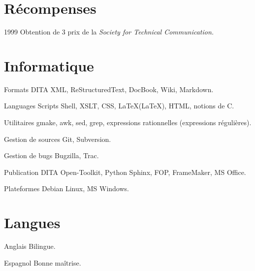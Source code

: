 \documentclass[12pt,a4paper,roman]{moderncv}
\begin{document}

\section{Récompenses}

\cvitem
    {1999}
    {Obtention de 3 prix de la \emph{Society for Technical Communication.}}


\section{Informatique}

\cvitem
    {Formats}
    {DITA XML, ReStructuredText, DocBook, Wiki, Markdown.}

\cvitem
    {Languages}
    {Scripts Shell, XSLT, CSS, \LaTeX (LaTeX), HTML, notions de C.}

\cvitem
    {Utilitaires}
    {gmake, awk, sed, grep, expressions rationnelles (expressions régulières).}

\cvitem
    {Gestion de sources}
    {Git, Subversion.}

\cvitem
    {Gestion de bugs}
    {Bugzilla, Trac.}

\cvitem
    {Publication}
    {DITA Open-Toolkit, Python Sphinx, FOP, FrameMaker, MS Office.}

\cvitem
    {Plateformes}
    {Debian Linux, MS Windows.}

\section{Langues}

\cvitem
    {Anglais}
    {Bilingue.}

\cvitem
    {Espagnol}
    {Bonne maîtrise.}

\end{document}

